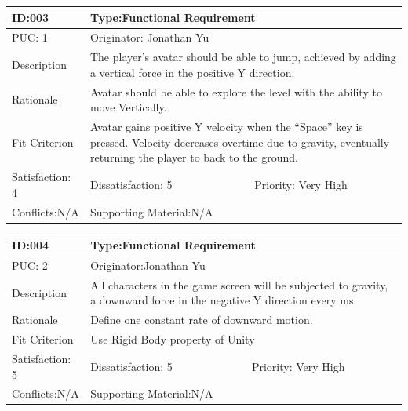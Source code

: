 \documentclass{article}
\begin{document}
	\begin{table}[H]
		\begin{tabular}{|l|l|l|}
			\hline
			ID:003&\multicolumn{2}{l|}{Type:Functional Requirement} \\ \hline
			PUC: 1& \multicolumn{2}{l|}{Originator: Jonathan Yu} \\ \hline
			Description & \multicolumn{2}{m{0.85\textwidth}|}{The player’s avatar should be able to jump, achieved by adding a vertical force in the positive Y direction.}\\\hline
			Rationale & \multicolumn{2}{m{0.85\textwidth}|}{Avatar should be able to explore the level with the ability to move Vertically.} \\ \hline
			Fit Criterion & \multicolumn{2}{m{0.85\textwidth}|}{Avatar gains positive Y velocity when the “Space” key is pressed. Velocity decreases overtime due to gravity, eventually returning the player to back to the ground.} \\ \hline
			Satisfaction: 4 & Dissatisfaction: 5 & Priority: Very High \\ \hline
			Conflicts:N/A & \multicolumn{2}{l|}{Supporting Material:N/A} \\ \hline
		\end{tabular}
	\end{table}

	\begin{table}[H]
		\begin{tabular}{|l|l|l|}
			\hline
			ID:004 & \multicolumn{2}{l|}{Type:Functional Requirement} \\ \hline
			PUC: 2& \multicolumn{2}{l|}{Originator:Jonathan Yu} \\ \hline
			Description & \multicolumn{2}{m{0.85\textwidth}|}{All characters in the game screen will be subjected to gravity, a downward force in the negative Y direction every ms.} \\ \hline
			Rationale & \multicolumn{2}{m{0.85\textwidth}|}{Define one constant rate of downward motion.} \\ \hline
			Fit Criterion & \multicolumn{2}{m{0.85\textwidth}|}{Use Rigid Body property of Unity} \\ \hline
			Satisfaction: 5 & Dissatisfaction: 5 & Priority: Very High \\ \hline
			Conflicts:N/A & \multicolumn{2}{l|}{Supporting Material:N/A} \\ \hline
		\end{tabular}
	\end{table}
\end{document}
